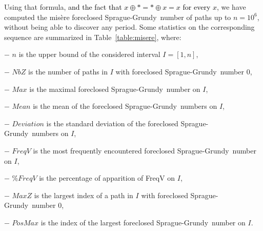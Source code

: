 \documentclass[11pt]{article}
\newcommand{\modif}[1]{\textcolor{black}{#1}}
\newcommand{\efface}[1]{}
\newcommand{\SP}{Sprague-Grundy}
\newcommand{\nimsum}{\oplus}
\begin{document}
Using that formula, \modif{and the fact that
$x\nimsum *=*\nimsum x=x$ for every $x$},
we have computed the mis\`ere foreclosed
\SP\ number of paths up to $n=10^6$, without being able to
discover any period. Some statistics on the corresponding
sequence are summarized in Table~\ref{table:misere}, where:
\efface{
\begin{itemize}
\item $n$ is the upper bound of the considered interval $I=[1,n]$,
\item $NbZ$ is the number of paths in $I$ with foreclosed \SP\ number 0,
\item $Max$ is the maximal foreclosed \SP\ number on $I$,
\item $Mean$ is the mean of the foreclosed \SP\ numbers on $I$,
\item $Deviation$ is the standard deviation of the foreclosed \SP\ numbers on $I$,
\item $FreqV$ is the most frequently encountered foreclosed \SP\ number on $I$,
\item $\% FreqV$ is the percentage of apparition of FreqV on $I$,
\item $MaxZ$ is the largest index of a path in $I$ with foreclosed \SP\ number 0,
\item $PosMax$ is the index of the largest foreclosed \SP\ number on $I$.\\
\end{itemize}
}

$-$ $n$ is the upper bound of the considered interval $I=[1,n]$,

$-$ $NbZ$ is the number of paths in $I$ with foreclosed \SP\ number 0,

$-$ $Max$ is the maximal foreclosed \SP\ number on $I$,

$-$ $Mean$ is the mean of the foreclosed \SP\ numbers on $I$,

$-$ $Deviation$ is the standard deviation of the foreclosed \SP\ numbers on $I$,

$-$ $FreqV$ is the most frequently encountered foreclosed \SP\ number on $I$,

$-$ $\% FreqV$ is the percentage of apparition of FreqV on $I$,

$-$ $MaxZ$ is the largest index of a path in $I$ with foreclosed \SP\ number 0,

$-$ $PosMax$ is the index of the largest foreclosed \SP\ number on $I$.
\end{document}
